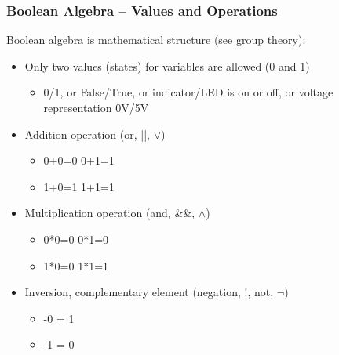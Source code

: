 \documentclass{beamer}
\begin{document}
\begin{frame}
\frametitle{Boolean Algebra -- Values and Operations}

Boolean algebra is mathematical structure (see group theory):
\begin{itemize}
\item Only two values (states) for variables are allowed (0 and 1)
\begin{itemize}
\item 0/1, or False/True, or indicator/LED is on or off, or voltage representation 0V/5V
\end{itemize}
\item Addition operation (or, ||, $\lor$)
\begin{itemize}
\item 0+0=0 \phantom{XXXX}  0+1=1
\item 1+0=1 \phantom{XXXX}  1+1=1
\end{itemize}
\item Multiplication operation (and, \&\&, $\land$)
\begin{itemize}
\item 0*0=0 \phantom{XXXX}  0*1=0
\item 1*0=0 \phantom{XXXX}  1*1=1
\end{itemize}
\item Inversion, complementary element (negation, !, not, $\neg$)
\begin{itemize}
\item -0 = 1
\item -1 = 0
\end{itemize}
\end{itemize}
\end{frame}
\end{document}
